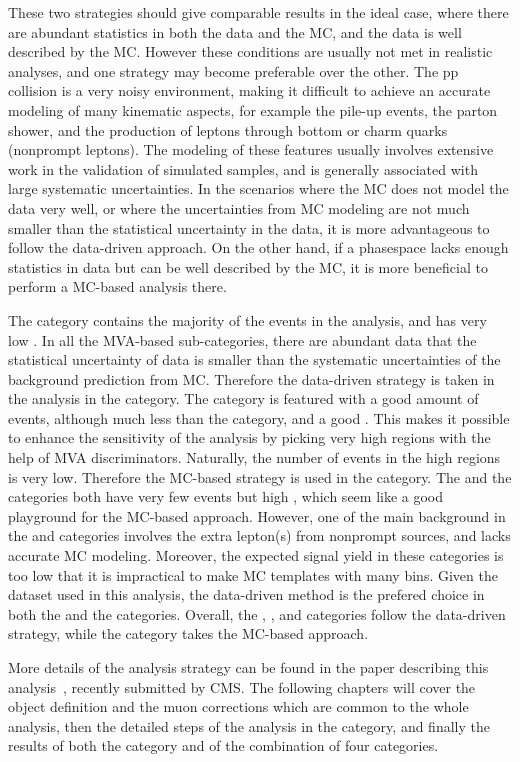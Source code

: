 These two strategies should give comparable results in the ideal case, where there are abundant statistics in both the data and the MC,
and the data is well described by the MC.
However these conditions are usually not met in realistic analyses, and one strategy may become preferable over the other.
The pp collision is a very noisy environment, making it difficult to achieve an accurate modeling of many kinematic aspects,
for example the pile-up events, the parton shower, and the production of leptons through bottom or charm quarks (nonprompt leptons).
The modeling of these features usually involves extensive work in the validation of simulated samples, and is generally associated with large systematic uncertainties.
In the scenarios where the MC does not model the data very well, or where the uncertainties from MC modeling are not much smaller than the statistical uncertainty in the data,
it is more advantageous to follow the data-driven approach.
On the other hand, if a phasespace lacks enough statistics in data but can be well described by the MC, 
it is more beneficial to perform a MC-based analysis there.

The \ggH category contains the majority of the events in the \hmm analysis, and has very low \SoB. 
In all the MVA-based sub-categories, there are abundant data that the statistical uncertainty of data is smaller than the systematic uncertainties of the background prediction from MC.
Therefore the data-driven strategy is taken in the analysis in the \ggH category.
The \qqH category is featured with a good amount of events, although much less than the \ggH category, and a good \SoB.
This makes it possible to enhance the sensitivity of the analysis by picking very high \SoB regions with the help of MVA discriminators. 
Naturally, the number of events in the high \SoB regions is very low. Therefore the MC-based strategy is used in the \qqH category.
The \VH and the \ttH categories both have very few events but high \SoB, which seem like a good playground for the MC-based approach.
However, one of the main background in the \VH and \ttH categories involves the extra lepton(s) from nonprompt sources, and lacks accurate MC modeling.
Moreover, the expected signal yield in these categories is too low that it is impractical to make MC templates with many bins.
Given the dataset used in this analysis, the data-driven method is the prefered choice in both the \VH and the \ttH categories.
Overall, the \ggH, \VH, and \ttH categories follow the data-driven strategy, while the \qqH category takes the MC-based approach.

More details of the analysis strategy can be found in the paper describing this analysis~\cite{cmscollaboration2020evidence}, recently submitted by CMS. 
The following chapters will cover the object definition and the muon corrections which are common to the whole analysis, 
then the detailed steps of the analysis in the \VH category, 
and finally the results of both the \VH category and of the combination of four categories.
